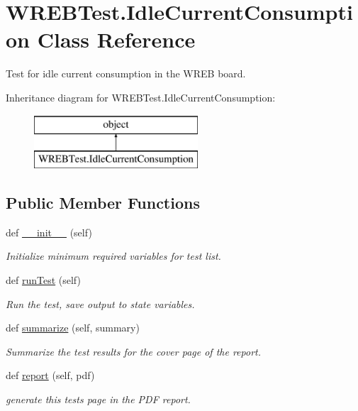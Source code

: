 \hypertarget{class_w_r_e_b_test_1_1_idle_current_consumption}{}\section{W\+R\+E\+B\+Test.\+Idle\+Current\+Consumption Class Reference}
\label{class_w_r_e_b_test_1_1_idle_current_consumption}


Test for idle current consumption in the W\+R\+EB board.  


Inheritance diagram for W\+R\+E\+B\+Test.\+Idle\+Current\+Consumption\+:\begin{figure}[H]
\begin{center}
\leavevmode
\includegraphics[height=2.000000cm]{class_w_r_e_b_test_1_1_idle_current_consumption}
\end{center}
\end{figure}
\subsection*{Public Member Functions}
\begin{DoxyCompactItemize}
\item 
def \hyperlink{class_w_r_e_b_test_1_1_idle_current_consumption_a7aec47c458783e4d1cdfe0df5c4973e3}{\+\_\+\+\_\+init\+\_\+\+\_\+} (self)
\begin{DoxyCompactList}\small\item\em Initialize minimum required variables for test list. \end{DoxyCompactList}\item 
def \hyperlink{class_w_r_e_b_test_1_1_idle_current_consumption_aeaa52c734d7528a4c120939189e4a500}{run\+Test} (self)
\begin{DoxyCompactList}\small\item\em Run the test, save output to state variables. \end{DoxyCompactList}\item 
def \hyperlink{class_w_r_e_b_test_1_1_idle_current_consumption_a867a45d43d305dcb08d1db2560c8db33}{summarize} (self, summary)
\begin{DoxyCompactList}\small\item\em Summarize the test results for the cover page of the report. \end{DoxyCompactList}\item 
def \hyperlink{class_w_r_e_b_test_1_1_idle_current_consumption_a0a8812f994c7429fa1632b8f75a6707f}{report} (self, pdf)
\begin{DoxyCompactList}\small\item\em generate this test\textquotesingle{}s page in the P\+DF report. \end{DoxyCompactList}\end{DoxyCompactItemize}


